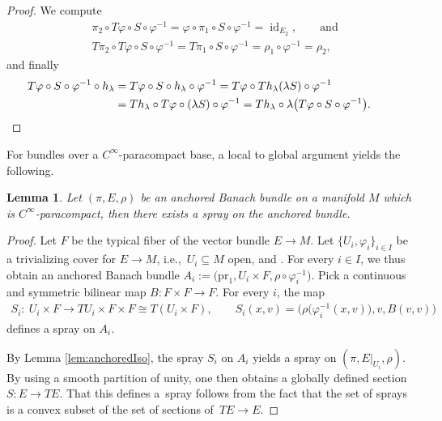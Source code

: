 \documentclass[pdftex]{sigma}
\numberwithin{equation}{section}
\newtheorem{Lemma}[Theorem]{Lemma}
\DeclareMathOperator{\id}{id}
\begin{document}
\begin{proof}
 We compute
 \begin{align*}
 &\pi_{2} \circ T\varphi \circ S \circ \varphi^{-1}= \varphi \circ \pi_{1} \circ S \circ \varphi^{-1} = \id_{E_{2}}, \qquad\text{and}\\
 &T\pi_{2} \circ T\varphi \circ S \circ \varphi^{-1}= T\pi_{1} \circ S \circ \varphi^{-1} = \rho_{1} \circ \varphi^{-1} = \rho_{2},
 \end{align*}
 and finally
 \begin{align*}
 T\varphi \circ S \circ \varphi^{-1} \circ h_{\lambda} &{}= T\varphi \circ S \circ h_{\lambda} \circ \varphi^{-1} = T \varphi \circ Th_{\lambda} (\lambda S) \circ \varphi^{-1} \\
 &{}= Th_{\lambda} \circ T\varphi \circ (\lambda S) \circ \varphi^{-1} = Th_{\lambda} \circ \lambda\bigl(T\varphi \circ S \circ \varphi^{-1}\bigr). \qedhere
\tag*{\qed}
\end{align*}
\renewcommand{\qed}{}
\end{proof}

For bundles over a $C^\infty$-paracompact base, a local to global argument yields the following.

\begin{Lemma}\label{lem:ex_spray_anchor}
Let $(\pi,E,\rho)$ be an anchored Banach bundle on a manifold $M$ which is $C^\infty$-paracompact, then there exists a spray on the anchored bundle.
\end{Lemma}

\begin{proof}
 Let $F$ be the typical fiber of the vector bundle $E \rightarrow M$.
 Let $\{U_{i}, \varphi_{i}\}_{i\in I}$ be a trivializing cover for $E \rightarrow M$, i.e.,~$U_{i} \subseteq M$ open, and .
 For every $i\in I$, we thus obtain an anchored Banach bundle $A_{i} := \bigl(\mathrm{pr}_{1},U_{i} \times F, \rho \circ \varphi_{i}^{-1}\bigr)$.
 Pick a continuous and symmetric bilinear map $B\colon F \times F \rightarrow F$.
 For every $i$, the map
 \begin{align*}
 S_{i}\colon\ U_{i} \times F \rightarrow TU_{i} \times F \times F \cong T(U_{i} \times F), \qquad
 S_i(x,v) = \bigl(\rho \bigl(\varphi_{i}^{-1}(x,v)\bigr),v,B(v,v)\bigr)
 \end{align*}
 defines a spray on $A_{i}$.

 By Lemma \ref{lem:anchoredIso}, the spray $S_{i}$ on $A_{i}$ yields a spray on $(\pi, E|_{U_{i}},\rho)$.
 By using a smooth partition of unity, one then obtains a globally defined section $S\colon E \rightarrow TE$.
 That this defines a~spray follows from the fact that the set of sprays is a convex subset of the set of sections of~${TE \rightarrow E}$.
\end{proof}
\end{document}
